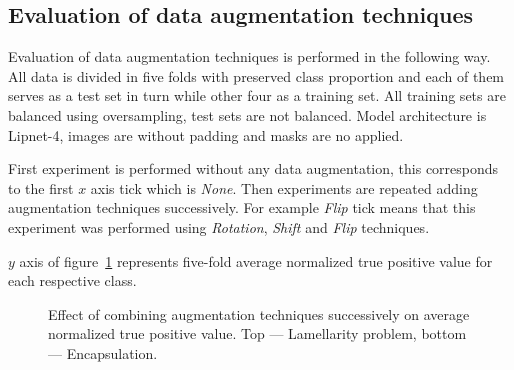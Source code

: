 \documentclass[a4paper, 11pt, table]{article}
\begin{document}
 

\subsection{Evaluation of data augmentation techniques}

Evaluation of data augmentation techniques is performed in the following way. All data is divided in five folds with preserved class proportion and each of them serves as a test set in turn while other four as a training set. All training sets are balanced using oversampling, test sets are not balanced. Model architecture is Lipnet-4, images are without padding and masks are no applied.

First experiment is performed without any data augmentation, this corresponds to the first $x$ axis tick which is \textit{None}. Then experiments are repeated adding augmentation techniques successively. For example \textit{Flip} tick means that this experiment was performed using \textit{Rotation}, \textit{Shift} and \textit{Flip} techniques.

$y$ axis of figure~\ref{fig:augmentation_evaluation} represents five-fold average normalized true positive value for each respective class. 

\begin{figure}[H]
\centering


\caption{\label{fig:augmentation_evaluation}Effect of combining augmentation techniques successively on average normalized true positive value. Top --- Lamellarity problem, bottom --- Encapsulation.}
\end{figure}
\end{document}
